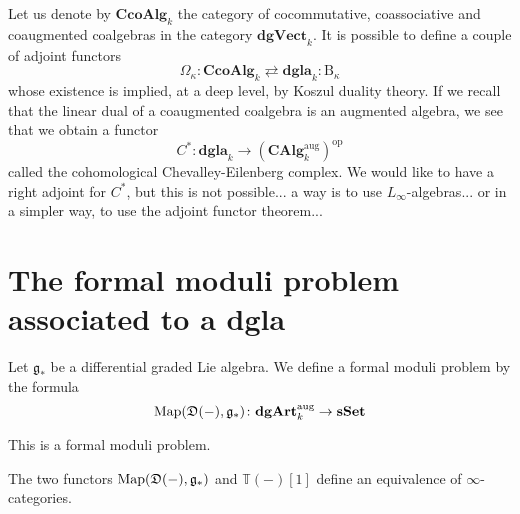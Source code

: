 \begin{refsection}
Let us denote by $\mathbf{CcoAlg}_k$ the category of cocommutative, coassociative and coaugmented coalgebras in the category $\mathbf{dgVect}_k$. It is possible to define a couple of adjoint functors
\[
\Omega_\kappa \colon \mathbf{CcoAlg}_k \rightleftarrows \mathbf{dgla}_k \colon \mathrm{B}_\kappa
\]
whose existence is implied, at a deep level, by Koszul duality theory. If we recall that the linear dual of a coaugmented coalgebra is an augmented algebra, we see that we obtain a functor
\[
C^* \colon \mathbf{dgla}_k \to (\mathbf{CAlg}_k^{\mathrm{aug}})^{\mathrm{op}}
\]
called the cohomological Chevalley-Eilenberg complex. We would like to have a right adjoint for $C^*$, but this is not possible... a way is to use $L_\infty$-algebras... or in a simpler way, to use the adjoint functor theorem...

\section{The formal moduli problem associated to a dgla}

Let $\mathfrak g_*$ be a differential graded Lie algebra. We define a formal moduli problem by the formula
\[
\operatorname{\mathrm{Map}}(\mathfrak D(-), \mathfrak g_*) \colon \mathbf{dgArt}_k^{\mathrm{aug}} \to \mathbf{sSet}
\]

\begin{lemma}
This is a formal moduli problem.
\end{lemma}

\begin{thm}
The two functors $\operatorname{\mathrm{Map}}(\mathfrak D(-), \mathfrak g_*)$ and $\mathbb T(-)[1]$ define an equivalence of $\infty$-categories.
\end{thm}

\printbibliography[heading = local]

\end{refsection}
